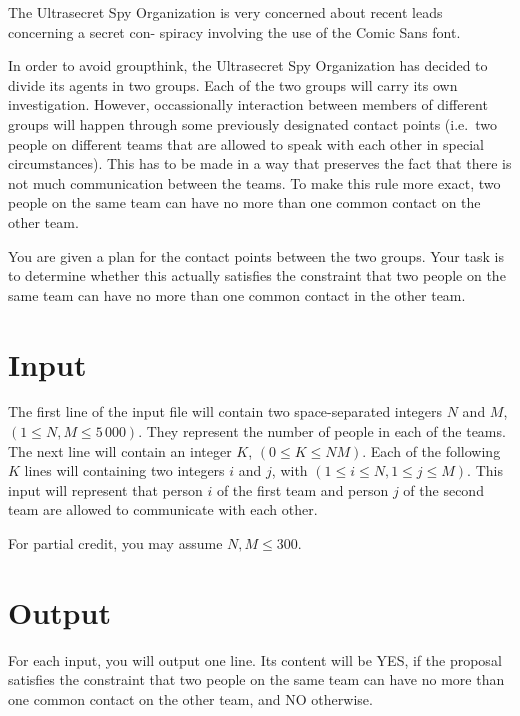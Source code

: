 The Ultrasecret Spy Organization is very concerned about recent leads concerning a secret con-
spiracy involving the use of the Comic Sans font.

In order to avoid groupthink, the Ultrasecret Spy Organization has decided to divide its agents in
two groups. Each of the two groups will carry its own investigation. However, occassionally
interaction between members of different groups will happen through some previously designated
contact points (i.e.\ two people on different teams that are allowed to speak with each other in
special circumstances). This has to be made in a way that preserves the fact that there is not much
communication between the teams. To make this rule more exact, two people on the same team can have
no more than one common contact on the other team.

You are given a plan for the contact points between the two groups. Your task is to determine
whether this actually satisfies the constraint that two people on the same team can have no more
than one common contact in the other team.

\section*{Input}
The first line of the input file will contain two space-separated integers $N$ and $M$, $(1 \le N, M
\le 5\,000)$. They represent the number of people in each of the teams. The next line will contain an
integer $K$, $(0 \le K \le NM)$. Each of the following $K$ lines will containing two integers $i$
and $j$, with $(1 \le i \le N, 1 \le j \le M)$. This input will represent that person $i$ of the
first team and person $j$ of the second team are allowed to communicate with each other.

For partial credit, you may assume $N, M \le 300$.

\section*{Output}
For each input, you will output one line. Its content will be YES, if the proposal satisfies the
constraint that two people on the same team can have no more than one common contact on the
other team, and NO otherwise.
